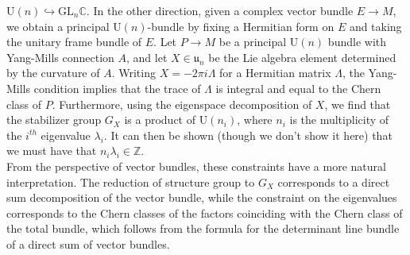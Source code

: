 \documentclass[psamsfonts, 12pt]{amsart}
\theoremstyle{definition}
\theoremstyle{remark}
\newcommand{\Z}{\mathbb{Z}}
\newcommand{\C}{\mathbb{C}}
\newcommand{\GL}{\mathrm{GL}}
\begin{document}
$\mathrm{U}(n) \hookrightarrow \GL_n\C$. In the other direction, given a complex
vector bundle $E \to M$, we obtain a principal $\mathrm{U}(n)$-bundle by fixing
a Hermitian form on $E$ and taking the unitary frame bundle of $E$. Let $P \to M$ be
a principal $\mathrm{U}(n)$ bundle with Yang-Mills connection $A$, and let
$X \in \mathfrak{u}_n$ be the Lie algebra element determined by the curvature of $A$.
Writing $X = -2\pi i \Lambda$ for a Hermitian matrix $\Lambda$, the Yang-Mills condition
implies that the trace of $\Lambda$ is integral and equal to the Chern class of $P$.
Furthermore, using the eigenspace decomposition of $X$, we find that the stabilizer
group $G_X$ is a product of $\mathrm{U}(n_i)$, where $n_i$ is the multiplicity of the
$i^{th}$ eigenvalue $\lambda_i$. It can then be shown (though we don't show it
here) that we must have that $n_i\lambda_i \in \Z$. \\

From the perspective of vector bundles, these constraints have a more natural
interpretation. The reduction of structure group to $G_X$ corresponds to a direct
sum decomposition of the vector bundle, while the constraint on the eigenvalues
corresponds to the Chern classes of the factors coinciding with the Chern class
of the total bundle, which follows from the formula for the determinant line bundle
of a direct sum of vector bundles.
%
\end{document}
